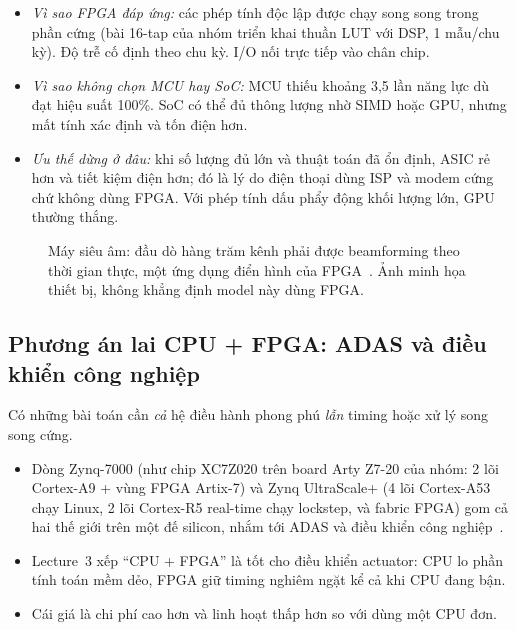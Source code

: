 \documentclass[11pt,a4paper]{article}
\begin{document}
\begin{itemize}
\item \emph{Vì sao FPGA đáp ứng:} các phép tính độc lập được chạy song song trong phần cứng (bài 16-tap của nhóm triển khai thuần LUT với \expFpgaDsp{} DSP, 1 mẫu/chu kỳ). Độ trễ cố định theo chu kỳ. I/O nối trực tiếp vào chân chip.
\item \emph{Vì sao không chọn MCU hay SoC:} MCU thiếu khoảng 3,5 lần năng lực dù đạt hiệu suất 100\%. SoC có thể đủ thông lượng nhờ SIMD hoặc GPU, nhưng mất tính xác định và tốn điện hơn.
\item \emph{Ưu thế dừng ở đâu:} khi số lượng đủ lớn và thuật toán đã ổn định, ASIC rẻ hơn và tiết kiệm điện hơn; đó là lý do điện thoại dùng ISP và modem cứng chứ không dùng FPGA. Với phép tính dấu phẩy động khối lượng lớn, GPU thường thắng.
\end{itemize}

\begin{figure}[htbp]
\centering
\begin{minipage}{0.32\linewidth}\centering
\end{minipage}
\caption{Máy siêu âm: đầu dò hàng trăm kênh phải được beamforming theo thời gian thực, một ứng dụng điển hình của FPGA~\cite{kou}. Ảnh minh họa thiết bị, không khẳng định model này dùng FPGA.}
\end{figure}

\subsection{Phương án lai CPU + FPGA: ADAS và điều khiển công nghiệp}\label{sec:hybrid}

Có những bài toán cần \emph{cả} hệ điều hành phong phú \emph{lẫn} timing hoặc xử lý song song cứng.
\begin{itemize}
\item Dòng Zynq-7000 (như chip XC7Z020 trên board Arty Z7-20 của nhóm: 2 lõi Cortex-A9 + vùng FPGA Artix-7) và Zynq UltraScale+ (4 lõi Cortex-A53 chạy Linux, 2 lõi Cortex-R5 real-time chạy lockstep, và fabric FPGA) gom cả hai thế giới trên một đế silicon, nhắm tới ADAS và điều khiển công nghiệp~\cite{eenews-zynq}.
\item Lecture~3 xếp ``CPU + FPGA'' là tốt cho điều khiển actuator: CPU lo phần tính toán mềm dẻo, FPGA giữ timing nghiêm ngặt kể cả khi CPU đang bận.
\item Cái giá là chi phí cao hơn và linh hoạt thấp hơn so với dùng một CPU đơn.
\end{itemize}
\end{document}
